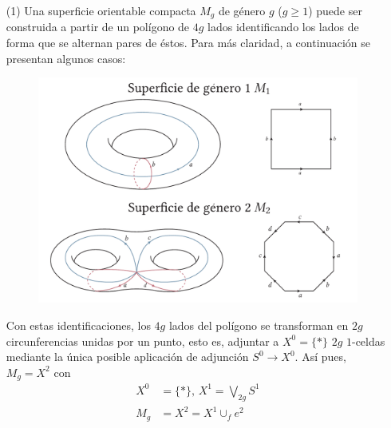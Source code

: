 \begin{ejems}
\begin{itemize}
\item[(1)] Una superficie orientable compacta $M_g$ de género $g$ ($ g \geq 1$) puede ser construida a partir de un polígono de $4g$ lados identificando los lados de forma que se alternan pares de éstos. Para más claridad, a continuación se presentan algunos casos: \par
\begin{figure}[h]
\centering
\includegraphics[width=\textwidth]{images/supgeng.pdf}
\end{figure} 
\par 
Con estas identificaciones, los $4g$ lados del polígono se transforman en $2g$ circunferencias unidas por un punto, esto es, adjuntar a $X^0 = \{ \ast \}$ $2g$ $1$-celdas mediante la única posible aplicación de adjunción $S^0 \longrightarrow X^0$. Así pues, $M_g = X^2$ con 
\begin{align*} 
X^0 &= \{ \ast \} \text{,  } X^1 = \bigvee_{2g} S^1 \\
M_g &= X^2 = X^1 \cup_f e^2
\end{align*}


\end{itemize}
\end{ejems}
